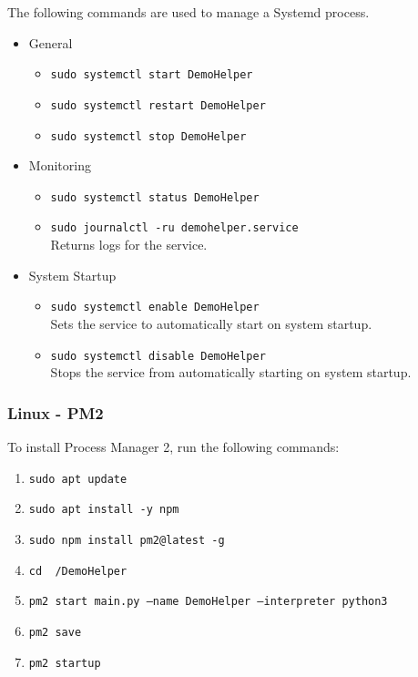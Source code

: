 The following commands are used to manage a Systemd process.
\begin{itemize}
	\item
	{
		General
		\begin{itemize}
			\item
			{
				\texttt{sudo systemctl start DemoHelper}
			}
			\item
			{
				\texttt{sudo systemctl restart DemoHelper}
			}
			\item
			{
				\texttt{sudo systemctl stop DemoHelper}
			}
		\end{itemize}
	}
	\item
	{
		Monitoring 
		\begin{itemize}
			\item
			{
				\texttt{sudo systemctl status DemoHelper}
			}
			\item
			{
				\texttt{sudo journalctl -ru demohelper.service}
				\\Returns logs for the service.
			}
		\end{itemize}
	}
	\item
	{
		System Startup 
		\begin{itemize}
			\item
			{
				\texttt{sudo systemctl enable DemoHelper}
				\\Sets the service to automatically start on system startup.
			}
			\item
			{
				\texttt{sudo systemctl disable DemoHelper}
				\\Stops the service from automatically starting on system startup.
			}
		\end{itemize}
	}
\end{itemize}

\subsubsection{Linux - PM2}
To install Process Manager 2, run the following commands:
\begin{enumerate}
	\item{\texttt{sudo apt update}}
	\item{\texttt{sudo apt install -y npm}}
	\item{\texttt{sudo npm install pm2@latest -g}}
	\item{\texttt{cd ~/DemoHelper}}
	\item{\texttt{pm2 start main.py --name DemoHelper --interpreter python3}}
	\item{\texttt{pm2 save}}
	\item{\texttt{pm2 startup}}
\end{enumerate}

